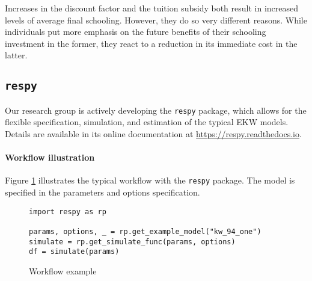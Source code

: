 \noindent Increases in the discount factor and the tuition subsidy both result in increased levels of average final schooling. However, they do so very different reasons. While individuals put more emphasis on the future benefits of their schooling investment in the former, they react to a reduction in its immediate cost in the latter.
\subsection{\texttt{respy}}
Our research group is actively developing the \verb+respy+ package, which allows for the flexible specification, simulation, and estimation of the typical EKW models. Details are available in its online documentation at \url{https://respy.readthedocs.io}.

\paragraph{Workflow illustration} Figure \ref{Workflow example} illustrates the typical workflow with the \verb+respy+ package. The model is specified in the parameters and options specification.

\begin{figure}[ht!]\centering
\caption{Workflow example}\label{Workflow example}
\begin{lstlisting}
import respy as rp

params, options, _ = rp.get_example_model("kw_94_one")
simulate = rp.get_simulate_func(params, options)
df = simulate(params)

\end{lstlisting}
\end{figure}
